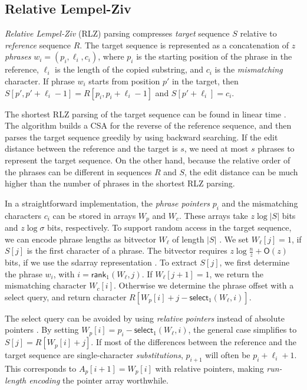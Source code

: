 \documentclass[a4paper,11pt]{llncs}
\newcommand{\abs}[1]{\ensuremath{\lvert #1 \rvert}}
\newcommand{\CSA}{\textsf{CSA}}
\newcommand{\RLZ}{\textsf{RLZ}}
\newcommand{\sdarray}{\textsf{sdarray}}
\newcommand{\select}{\textsf{select}}
\newcommand{\mrank}{\ensuremath{\mathsf{rank}}}
\newcommand{\mselect}{\ensuremath{\mathsf{select}}}
\newcommand{\Oh}{\ensuremath{\mathsf{O}}}
\begin{document}
\subsection{Relative Lempel-Ziv}\label{sect:rlz}

\emph{Relative Lempel-Ziv} (\RLZ) parsing \cite{Kuruppu2010} compresses \emph{target} sequence $S$ relative to \emph{reference} sequence $R$. The target sequence is represented as a concatenation of $z$ \emph{phrases} $w_{i} = (p_{i}, \ell_{i}, c_{i})$, where $p_{i}$ is the starting position of the phrase in the reference, $\ell_{i}$ is the length of the copied substring, and $c_{i}$ is the \emph{mismatching} character. If phrase $w_{i}$ starts from position $p'$ in the target, then $S[p',p'+\ell_{i}-1] = R[p_{i},p_{i}+\ell_{i}-1]$ and $S[p'+\ell_{i}] = c_{i}$.

The shortest \RLZ{} parsing of the target sequence can be found in linear time \cite{???}. The algorithm builds a \CSA{} for the reverse of the reference sequence, and then parses the target sequence greedily by using backward searching. If the edit distance between the reference and the target is $s$, we need at most $s$ phrases to represent the target sequence. On the other hand, because the relative order of the phrases can be different in sequences $R$ and $S$, the edit distance can be much higher than the number of phrases in the shortest \RLZ{} parsing.

In a straightforward implementation, the \emph{phrase pointers} $p_{i}$ and the mismatching characters $c_{i}$ can be stored in arrays $W_{p}$ and $W_{c}$. These arrays take $z \log \abs{S}$ bits and $z \log \sigma$ bits, respectively. To support random access in the target sequence, we can encode phrase lengths as bitvector $W_{\ell}$ of length $\abs{S}$ \cite{Kuruppu2010}. We set $W_{\ell}[j] = 1$, if $S[j]$ is the first character of a phrase. The bitvector requires $z \log \frac{n}{z} + \Oh(z)$ bits, if we use the \sdarray{} representation \cite{Okanohara2007}. To extract $S[j]$, we first determine the phrase $w_{i}$, with $i = \mrank_{1}(W_{\ell}, j)$. If $W_{\ell}[j+1] = 1$, we return the mismatching character $W_{c}[i]$. Otherwise we determine the phrase offset with a \select{} query, and return character $R[W_{p}[i] + j - \mselect_{1}(W_{\ell}, i)]$.

The \select{} query can be avoided by using \emph{relative pointers} instead of absolute pointers \cite{Ferrada2014}. By setting $W_{p}[i] = p_{i} - \mselect_{1}(W_{\ell}, i)$, the general case simplifies to $S[j] = R[W_{p}[i] + j]$. If most of the differences between the reference and the target sequence are single-character \emph{substitutions}, $p_{i+1}$ will often be $p_{i} + \ell_{i} + 1$. This corresponds to $A_{p}[i+1] = W_{p}[i]$ with relative pointers, making \emph{run-length encoding} the pointer array worthwhile.
\end{document}
